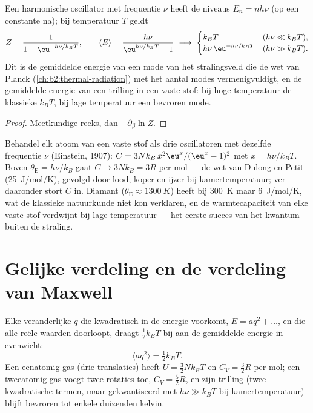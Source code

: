 \begin{proposition}\label{prop:b2:boltzmann-factor:oscillator}
Een harmonische oscillator met frequentie $\nu$ heeft de niveaus $E_n = nh\nu$ (op
een constante na); bij temperatuur $T$ geldt
\[
Z = \frac{1}{1 - \eu^{-h\nu/k_BT}}, \qquad
\langle E\rangle = \frac{h\nu}{\eu^{h\nu/k_BT} - 1}
\ \longrightarrow\
\begin{cases} k_BT & (h\nu \ll k_BT), \\ h\nu\,\eu^{-h\nu/k_BT} & (h\nu \gg k_BT). \end{cases}
\]
Dit is de gemiddelde energie van een mode van het stralingsveld die de wet
van Planck (\cref{ch:b2:thermal-radiation}) met het aantal modes vermenigvuldigt,
en de gemiddelde energie van een trilling in een vaste stof: bij hoge temperatuur de
klassieke $k_BT$, bij lage temperatuur een bevroren mode.
\end{proposition}

\begin{proof}
Meetkundige reeks, dan $-\partial_\beta\ln Z$.
\end{proof}

\begin{example}\label{ex:b2:boltzmann-factor:einstein}
Behandel elk atoom van een vaste stof als drie oscillatoren met dezelfde frequentie
$\nu$ (Einstein, 1907): $C = 3Nk_B\,x^2\eu^x/(\eu^x - 1)^2$ met
$x =
h\nu/k_BT$. Boven $\theta_{\text{E}} = h\nu/k_B$ gaat
$C \to 3Nk_B = 3R$ per mol
--- de wet van Dulong en Petit (\qty{25}{J/mol/K}), gevolgd door lood,
koper en ijzer bij kamertemperatuur; ver daaronder stort $C$ in. Diamant
($\theta_{\text{E}} \approx \qty{1300}{K}$) heeft bij \qty{300}{K} maar
\qty{6}{J/mol/K},
wat de klassieke natuurkunde niet kon verklaren, en de warmtecapaciteit van
elke vaste stof verdwijnt bij lage temperatuur --- het eerste succes van het
kwantum buiten de straling.
\end{example}

\section{Gelijke verdeling en de verdeling van Maxwell}

\begin{theorem}\label{thm:b2:boltzmann-factor:equipartition}
Elke veranderlijke $q$ die kwadratisch in de energie voorkomt,
$E = aq^2 +
\dots$, en die alle reële waarden doorloopt, draagt
$\tfrac12k_BT$ bij aan
de gemiddelde energie in evenwicht:
\[
\langle aq^2\rangle = \tfrac12k_BT .
\]
Een eenatomig gas (drie translaties) heeft $U = \tfrac32Nk_BT$ en
$C_V =
\tfrac32R$ per mol; een tweeatomig gas voegt twee rotaties toe,
$C_V = \tfrac52R$,
en zijn trilling (twee kwadratische termen, maar gekwantiseerd met
$h\nu \gg
k_BT$ bij kamertemperatuur) blijft bevroren tot enkele duizenden
kelvin.
\end{theorem}

